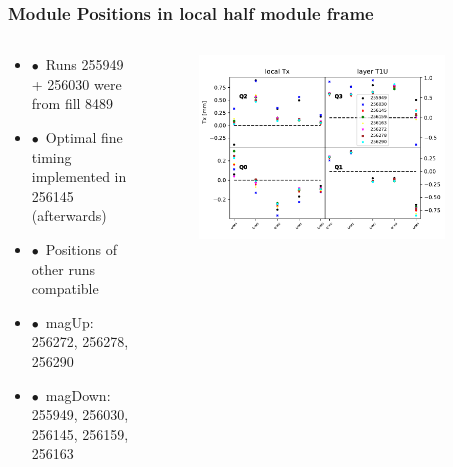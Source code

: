 \documentclass[aspectratio=1610, 12pt]{beamer}
\begin{document}
\begin{frame}\frametitle{Module Positions in local half module frame}
  \begin{columns}
    \begin{column}[c]{0.35\textwidth}
      \begin{itemize}
        \setlength\itemsep{0em}
        \item $\bullet$\, Runs 255949 + 256030 were from fill 8489
        \item $\bullet$\, Optimal fine timing implemented in 256145 (afterwards)
        \item $\bullet$\, Positions of other runs compatible
        \item $\bullet$\, magUp: 256272, 256278, 256290
        \item $\bullet$\, magDown: 255949, 256030, 256145, 256159, 256163
      \end{itemize}
    \end{column}
    \begin{column}[c]{0.65\textwidth}
      \begin{figure}
        \includegraphics[width=0.9\textwidth]{plots/plain_data/raw_data_T1U_Tx.pdf}
      \end{figure}
    \end{column}
  \end{columns}
\end{frame}
\end{document}
